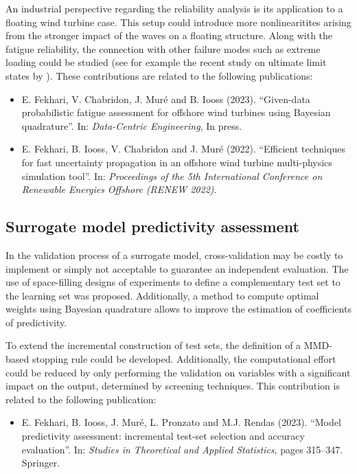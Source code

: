 An industrial perspective regarding the reliability analysis is its application to a floating wind turbine case. 
This setup could introduce more nonlinearitites arising from the stronger impact of the waves on a floating structure. 
Along with the fatigue reliability, the connection with other failure modes such as extreme loading could be studied (see for example the recent study on ultimate limit states by \citealp{wang_schar_2023_uls}). 
These contributions are related to the following publications:
\begin{itemize}
    \footnotesize
    \item[\ding{125}] E. Fekhari, V. Chabridon, J. Muré and B. Iooss (2023). ``Given-data probabilistic fatigue assessment for offshore wind turbines using Bayesian quadrature''. In: \textit{Data-Centric Engineering}, In press.
    \item[\ding{125}] E. Fekhari, B. Iooss, V. Chabridon and J. Muré (2022). ``Efficient techniques for fast uncertainty propagation in an offshore wind turbine multi-physics simulation tool''. In: \textit{Proceedings of the 5th International Conference on Renewable Energies Offshore (RENEW 2022)}.
\end{itemize}

\subsection*{Surrogate model predictivity assessment}

In the validation process of a surrogate model, cross-validation may be costly to implement or simply not acceptable to guarantee an independent evaluation.  
The use of space-filling designs of experiments to define a complementary test set to the learning set was proposed. 
Additionally, a method to compute optimal weights using Bayesian quadrature allows to improve the estimation of coefficients of predictivity. 

To extend the incremental construction of test sets, the definition of a MMD-based stopping rule could be developed. 
Additionally, the computational effort could be reduced by only performing the validation on variables with a significant impact on the output, determined by screening techniques. 
This contribution is related to the following publication:
\begin{itemize}
    \footnotesize
    \item[\ding{125}] E. Fekhari, B. Iooss, J. Muré, L. Pronzato and M.J. Rendas (2023). ``Model predictivity assessment: incremental test-set selection and accuracy evaluation''. In: \textit{Studies in Theoretical and Applied Statistics}, pages 315--347. Springer.
\end{itemize}

